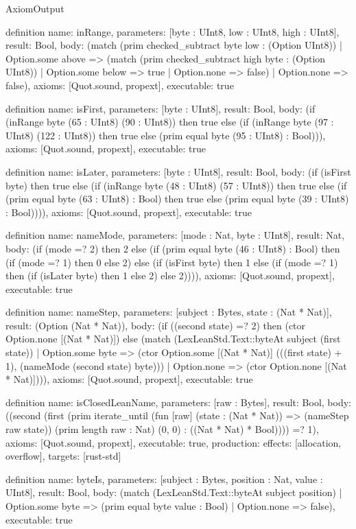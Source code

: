 \begin{lexlean}{AxiomOutput}
\begin{semanticmodule}
definition{
  name: inRange,
  parameters: [byte : UInt8, low : UInt8, high : UInt8],
  result: Bool,
  body: (match (prim checked_subtract byte low : (Option UInt8))
    | Option.some above => (match (prim checked_subtract high byte : (Option UInt8))
      | Option.some below => true
      | Option.none => false)
    | Option.none => false),
  axioms: [Quot.sound, propext],
  executable: true
}

definition{
  name: isFirst,
  parameters: [byte : UInt8],
  result: Bool,
  body: (if (inRange byte (65 : UInt8) (90 : UInt8)) then true else (if (inRange byte (97 : UInt8) (122 : UInt8)) then true else (prim equal byte (95 : UInt8) : Bool))),
  axioms: [Quot.sound, propext],
  executable: true
}

definition{
  name: isLater,
  parameters: [byte : UInt8],
  result: Bool,
  body: (if (isFirst byte) then true else (if (inRange byte (48 : UInt8) (57 : UInt8)) then true else (if (prim equal byte (63 : UInt8) : Bool) then true else (prim equal byte (39 : UInt8) : Bool)))),
  axioms: [Quot.sound, propext],
  executable: true
}

definition{
  name: nameMode,
  parameters: [mode : Nat, byte : UInt8],
  result: Nat,
  body: (if (mode =? 2) then 2 else (if (prim equal byte (46 : UInt8) : Bool) then (if (mode =? 1) then 0 else 2) else (if (isFirst byte) then 1 else (if (mode =? 1) then (if (isLater byte) then 1 else 2) else 2)))),
  axioms: [Quot.sound, propext],
  executable: true
}

definition{
  name: nameStep,
  parameters: [subject : Bytes, state : (Nat * Nat)],
  result: (Option (Nat * Nat)),
  body: (if ((second state) =? 2) then (ctor Option.none [(Nat * Nat)]) else (match (LexLeanStd.Text::byteAt subject (first state))
    | Option.some byte => (ctor Option.some [(Nat * Nat)] (((first state) + 1), (nameMode (second state) byte)))
    | Option.none => (ctor Option.none [(Nat * Nat)]))),
  axioms: [Quot.sound, propext],
  executable: true
}

definition{
  name: isClosedLeanName,
  parameters: [raw : Bytes],
  result: Bool,
  body: ((second (first (prim iterate_until (fun [raw] (state : (Nat * Nat)) => (nameStep raw state)) (prim length raw : Nat) (0, 0) : ((Nat * Nat) * Bool)))) =? 1),
  axioms: [Quot.sound, propext],
  executable: true,
  production: {effects: [allocation, overflow], targets: [rust-std]}
}

definition{
  name: byteIs,
  parameters: [subject : Bytes, position : Nat, value : UInt8],
  result: Bool,
  body: (match (LexLeanStd.Text::byteAt subject position)
    | Option.some byte => (prim equal byte value : Bool)
    | Option.none => false),
  executable: true
}


\end{semanticmodule}
\end{lexlean}
